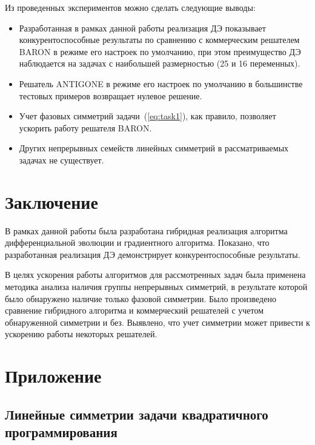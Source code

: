 \documentclass{llncs}
\begin{document}
Из проведенных экспериментов можно сделать следующие выводы:
\begin{itemize}
  \item Разработанная в рамках данной работы реализация ДЭ показывает конкурентоспособные результаты по сравнению с коммерческим решателем BARON в режиме его настроек по умолчанию, при этом преимущество ДЭ наблюдается на задачах с наибольшей размерностью (25 и 16 переменных).
  \item Решатель ANTIGONE в режиме его настроек по умолчанию в большинстве тестовых примеров возвращает нулевое решение.
  \item Учет фазовых симметрий задачи~(\ref{eq:task1}), как правило, позволяет ускорить работу решателя BARON.
  \item Других непрерывных семейств линейных симметрий в рассматриваемых задачах не существует.
\end{itemize}

\section{Заключение}\label{sec:conclusion}

В рамках данной работы была разработана гибридная реализация алгоритма дифференциальной эволюции и градиентного алгоритма. Показано, что разработанная реализация ДЭ демонстрирует конкурентоспособные результаты.

В целях ускорения работы алгоритмов для рассмотренных задач была применена методика анализа наличия группы непрерывных симметрий, в результате которой было обнаружено наличие только фазовой симметрии. Было произведено сравнение гибридного алгоритма и коммерческий решателей с учетом обнаруженной симметрии и без. Выявлено, что учет симметрии может привести к ускорению работы некоторых решателей.


\section*{Приложение}\label{sec:sym}
\subsection*{Линейные симметрии задачи квадратичного программирования}\label{sec:sym:mod}
\end{document}
